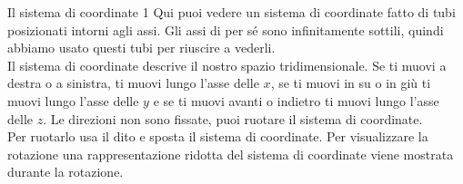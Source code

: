 \begin{surferPage}[Coordinate 1]{Il sistema di coordinate 1}
Qui puoi vedere un sistema di coordinate fatto di tubi posizionati intorni agli assi. Gli assi di per s\'e sono infinitamente sottili, quindi abbiamo usato questi tubi per riuscire a vederli.\\
Il sistema di coordinate descrive il nostro spazio tridimensionale. Se ti muovi a destra o a sinistra, ti muovi lungo l'asse delle $x$, se ti muovi in su o in 
gi\`u ti muovi lungo l'asse delle $y$ e se ti muovi avanti o indietro ti muovi lungo l'asse delle $z$. Le direzioni non sono fissate,  puoi ruotare il sistema di coordinate.\\
\vspace{0.3cm}
Per ruotarlo usa il dito e sposta il sistema di coordinate. Per visualizzare la rotazione una rappresentazione ridotta del sistema di coordinate viene mostrata durante la rotazione.
\end{surferPage}

